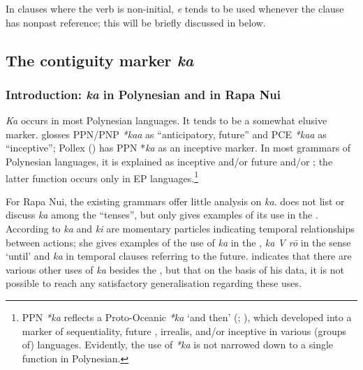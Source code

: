 In clauses where the verb is non-initial, \textit{e} tends to be used whenever the clause has nonpast reference; this will be briefly discussed in  below.
\subsection{The contiguity marker \textit{ka}}\label{sec:7.2.6}
\subsubsection[Introduction: ka in Polynesian and in Rapa Nui]{Introduction: \textit{ka} in Polynesian and in Rapa Nui}\label{sec:7.2.6.1}

\textit{Ka} occurs in most Polynesian languages. It tends to be a somewhat elusive marker. \citet[347–348]{Pawley1970} glosses PPN/PNP \textit{*kaa} as “anticipatory, future” and PCE \textit{*kaa} as “inceptive”; Pollex (\citealt{GreenhillClark2011}) has PPN *\textit{ka} as an inceptive marker. In most grammars of Polynesian languages, it is explained as inceptive and/or future and/or ; the latter function occurs only in EP languages.\footnote{\label{fn:330}PPN \textit{*ka} reflects a Proto-Oceanic  \textit{*ka} ‘and then’ (\citealt[85]{LynchRoss2002}; \citealt{Lichtenberk2014}), which developed into a marker of sequentiality, future , irrealis,  and/or inceptive in various (groups of) languages. Evidently, the use of \textit{*ka} is not narrowed down to a single function in Polynesian.} 

For Rapa Nui, the existing grammars offer little analysis on \textit{ka}. \citet[63, 72]{Englert1978} does not list or discuss \textit{ka} among the “tenses”, but only gives examples of its use in the . According to \citet[37]{DuFeu1996} \textit{ka} and \textit{ki} are momentary particles indicating temporal relationships between actions; she gives examples of the use of \textit{ka} in the  , \textit{ka V rō} in the sense ‘until’  and \textit{ka} in temporal clauses referring to the future. \citet[154]{Chapin1978} indicates that there are various other uses of \textit{ka} besides the , but that on the basis of his data, it is not possible to reach any satisfactory generalisation regarding these uses.

